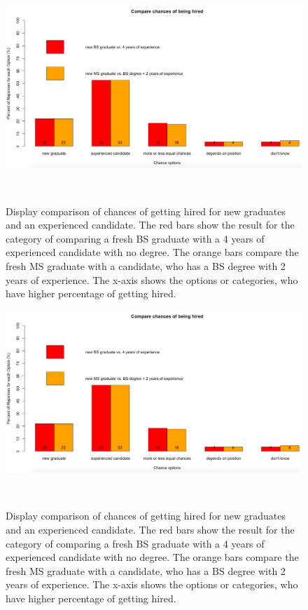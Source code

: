 \documentclass{sigchi}
\begin{document}
\begin{figure}
\centering
  \includegraphics[width=1.05\columnwidth]{figures/compare_BS_MS_exp_job_chances}
  \caption{Display comparison of chances of getting hired for new graduates and an experienced candidate. The red bars show the result for the category of comparing a fresh BS graduate with a 4 years of experienced candidate with no degree. The orange bars compare the fresh MS graduate with a candidate, who has a BS degree with 2 years of experience. The x-axis shows the options or categories, who have higher percentage of getting hired.}~\label{fig:figure 6}
\end{figure}

\begin{figure}
\centering
  \includegraphics[width=1.05\columnwidth]{figures/compare_BS_MS_exp_job_chances}
  \caption{Display comparison of chances of getting hired for new graduates and an experienced candidate. The red bars show the result for the category of comparing a fresh BS graduate with a 4 years of experienced candidate with no degree. The orange bars compare the fresh MS graduate with a candidate, who has a BS degree with 2 years of experience. The x-axis shows the options or categories, who have higher percentage of getting hired.}~\label{fig:figure 7}
\end{figure}
\end{document}
